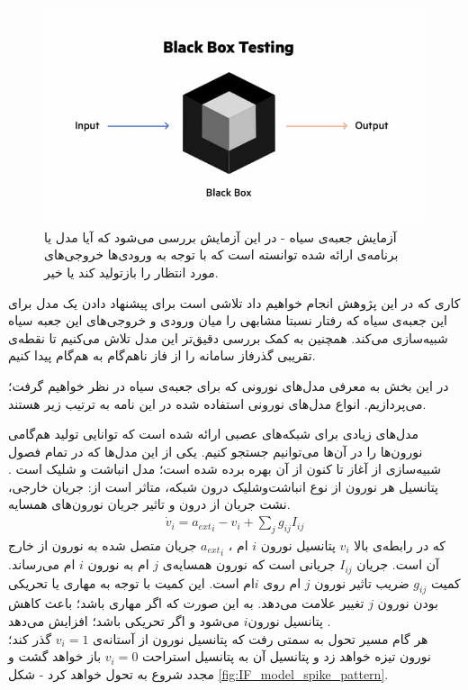 \begin{figure}
	\centering
	\includegraphics[width=\textwidth]{../Figures/Black_box_test.jpg}
	\caption{
		آزمایش جعبه‌ی سیاه - در این آزمایش بررسی می‌شود که آیا مدل یا برنامه‌ی ارائه شده توانسته است که با توجه به ورودی‌ها خروجی‌های مورد انتظار را بازتولید کند یا خیر.}
	\label{fig:black_box}
\end{figure}

  کاری که در این پژوهش انجام خواهیم داد تلاشی است برای پیشنهاد دادن یک مدل برای این جعبه‌ی سیاه که رفتار نسبتا مشابهی را میان ورودی و خروجی‌های این جعبه سیاه شبیه‌سازی می‌کند. همچنین به کمک بررسی دقیق‌تر این مدل تلاش می‌کنیم تا نقطه‌ی تقریبی گذرفاز سامانه را از فاز ناهم‌گام به هم‌گام پیدا کنیم.

در این بخش به معرفی مدل‌های نورونی که برای جعبه‌ی سیاه در نظر خواهیم گرفت؛ می‌پردازیم. انواع مدل‌های نورونی استفاده شده در این نامه به ترتیب زیر هستند.

مدل‌های زیادی برای شبکه‌های عصبی ارائه شده است که توانایی تولید هم‌گامی نورون‌ها را در آن‌ها می‌توانیم جستجو کنیم. یکی از این مدل‌ها که در تمام فصول شبیه‌سازی از آغاز تا کنون از آن بهره برده شده است؛ مدل انباشت و شلیک است
\cite{brunel2007quantitative, lapicque1907}. 
پتانسیل هر نورون از نوع انباشت‌وشلیک درون شبکه، متاثر است از: جریان خارجی، نشت جریان از درون و تاثیر جریان نورون‌های همسایه.
\begin{align}
	\dot{v}_i = {a_{ext}}_i - v_i + \sum_j g_{ij} I_{ij}
\end{align}
که در رابطه‌ی بالا 
$v_i$
پتانسیل نورون $i$ ام ،
${a_{ext}}_i$
جریان متصل شده به نورون از خارج آن است. جریان
$I_{ij}$
جریانی است که نورون همسایه‌ی $j$ ام به نورون $i$ ام می‌رساند. کمیت
$g_{ij}$
ضریب تاثیر نورون $j$ ام روی $i$ام است. این کمیت با توجه به مهاری یا تحریکی بودن نورون $j$ تغییر علامت می‌دهد. به این صورت که اگر مهاری باشد؛ باعث کاهش پتانسیل نورون$i$ می‌شود و اگر تحریکی باشد؛ افزایش می‌دهد
\cite{Erö2018}.\\
هر گام مسیر تحول به سمتی رفت که پتانسیل نورون از آستانه‌ی 
$v_i = 1$
گذر کند؛ نورون تیزه خواهد زد و پتانسیل آن به پتانسیل استراحت
$v_i = 0$
باز خواهد گشت و مجدد شروع به تحول خواهد کرد - شکل
\ref{fig:IF_model_spike_pattern}.

